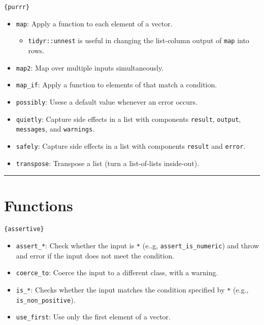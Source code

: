 \documentclass[
]{book}
\providecommand{\tightlist}{%
  \setlength{\itemsep}{0pt}\setlength{\parskip}{0pt}}
\begin{document}
\texttt{\{purrr\}}

\begin{itemize}
\tightlist
\item
  \texttt{map}: Apply a function to each element of a vector.

  \begin{itemize}
  \tightlist
  \item
    \texttt{tidyr::unnest} is useful in changing the list-column output of \texttt{map} into rows.
  \end{itemize}
\item
  \texttt{map2}: Map over multiple inputs simultaneously.
\item
  \texttt{map\_if}: Apply a function to elements of that match a condition.
\item
  \texttt{possibly}: Usese a default value whenever an error occurs.
\item
  \texttt{quietly}: Capture side effects in a list with components \texttt{result}, \texttt{output}, \texttt{messages}, and \texttt{warnings}.
\item
  \texttt{safely}: Capture side effects in a list with components \texttt{result} and \texttt{error}.
\item
  \texttt{transpose}: Transpose a list (turn a list-of-lists inside-out).
\end{itemize}

\begin{center}\rule{0.5\linewidth}{0.5pt}\end{center}

\hypertarget{functions}{%
\section{Functions}\label{functions}}

\texttt{\{assertive\}}

\begin{itemize}
\tightlist
\item
  \texttt{assert\_*}: Check whether the input is \texttt{*} (e..g, \texttt{assert\_is\_numeric}) and throw and error if the input does not meet the condition.
\item
  \texttt{coerce\_to}: Coerce the input to a different class, with a warning.
\item
  \texttt{is\_*}: Checks whether the input matches the condition specified by \texttt{*} (e.g., \texttt{is\_non\_positive}).
\item
  \texttt{use\_first}: Use only the first element of a vector.
\end{itemize}
\end{document}
